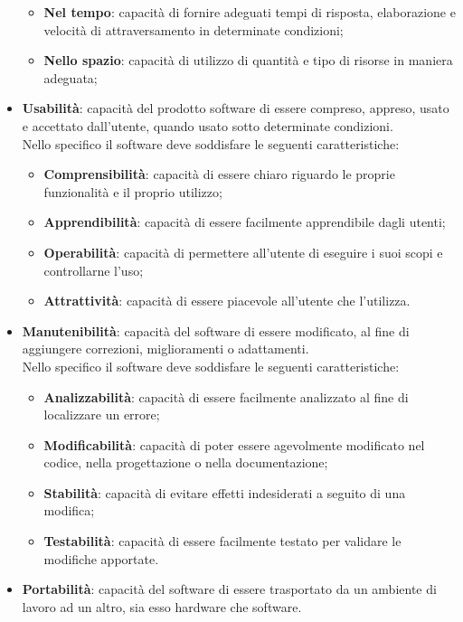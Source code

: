 \begin{itemize}
		\begin{itemize}
			\item \textbf{Nel tempo}: capacità di fornire adeguati tempi di risposta, elaborazione e velocità di attraversamento in determinate condizioni;
			\item \textbf{Nello spazio}: capacità di utilizzo di quantità e tipo di risorse in maniera adeguata;
		\end{itemize}
		\item \textbf{Usabilità}: capacità del prodotto software di essere compreso, appreso, usato e accettato dall'utente, quando usato sotto determinate condizioni.\\
		Nello specifico il software deve soddisfare le seguenti caratteristiche:
		\begin{itemize}
			\item \textbf{Comprensibilità}: capacità di essere chiaro riguardo le proprie funzionalità e il proprio utilizzo;
			\item \textbf{Apprendibilità}: capacità di essere facilmente apprendibile dagli utenti;
			\item \textbf{Operabilità}: capacità di permettere all'utente di eseguire i suoi scopi e controllarne l'uso;
			\item \textbf{Attrattività}: capacità di essere piacevole all'utente che l'utilizza.
		\end{itemize}
		\item \textbf{Manutenibilità}: capacità del software di essere modificato, al fine di aggiungere correzioni, miglioramenti o adattamenti.\\
		Nello specifico il software deve soddisfare le seguenti caratteristiche:
		\begin{itemize}
			\item \textbf{Analizzabilità}: capacità di essere facilmente analizzato al fine di localizzare un errore;
			\item \textbf{Modificabilità}: capacità di poter essere agevolmente modificato nel codice, nella progettazione o nella documentazione;
			\item \textbf{Stabilità}: capacità di evitare effetti indesiderati a seguito di una modifica;
			\item \textbf{Testabilità}: capacità di essere facilmente testato per validare le modifiche apportate.
		\end{itemize}
		\item \textbf{Portabilità}: capacità del software di essere trasportato da un ambiente di lavoro ad un altro, sia esso hardware che software.\\

\end{itemize}
